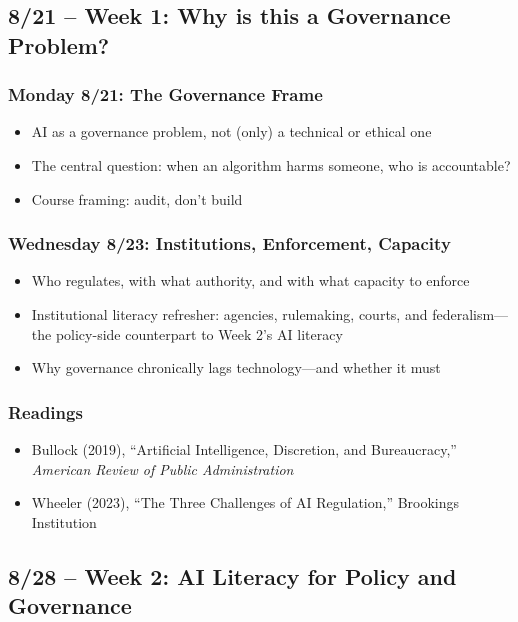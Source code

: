 \documentclass[12pt]{article}
\begin{document}
\subsection*{8/21 -- Week 1: Why is this a Governance Problem?}
    \subsubsection*{Monday 8/21: The Governance Frame}
        \begin{itemize}
            \item AI as a governance problem, not (only) a technical or ethical one
            \item The central question: when an algorithm harms someone, who is accountable?
            \item Course framing: audit, don't build
        \end{itemize}
    \subsubsection*{Wednesday 8/23: Institutions, Enforcement, Capacity}
        \begin{itemize}
            \item Who regulates, with what authority, and with what capacity to enforce
            \item Institutional literacy refresher: agencies, rulemaking, courts, and federalism---the policy-side counterpart to Week 2's AI literacy
            \item Why governance chronically lags technology---and whether it must
        \end{itemize}
    \subsubsection*{Readings}
        \begin{itemize}
            \item Bullock (2019), ``Artificial Intelligence, Discretion, and Bureaucracy,'' \emph{American Review of Public Administration}
            \item Wheeler (2023), ``The Three Challenges of AI Regulation,'' Brookings Institution
        \end{itemize}

\subsection*{8/28 -- Week 2: AI Literacy for Policy and Governance}
\end{document}
